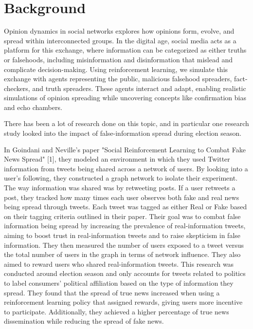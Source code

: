 \documentclass[twoside]{article}
\begin{document}
\section{Background}
Opinion dynamics in social networks explores how opinions form, evolve, and spread within interconnected groups. In the digital age, social media acts as a platform for this exchange, where information can be categorized as either truths or falsehoods, including misinformation and disinformation that mislead and complicate decision-making. Using reinforcement learning, we simulate this exchange with agents representing the public, malicious falsehood spreaders, fact-checkers, and truth spreaders. These agents interact and adapt, enabling realistic simulations of opinion spreading while uncovering concepts like confirmation bias and echo chambers.


There has been a lot of research done on this topic, and in particular one research study looked into the impact of false-information spread during election season.

In Goindani and Neville's paper "Social Reinforcement Learning to Combat Fake News Spread" [1], they modeled an environment in which they used Twitter information from tweets being shared across a network of users. By looking into a user's following, they constructed a graph network to isolate their experiment. The way information was shared was by retweeting posts. If a user retweets a post, they tracked how many times each user observes both fake and real news being spread through tweets. Each tweet was tagged as either Real or Fake based on their tagging criteria outlined in their paper. Their goal was to combat false information being spread by increasing the prevalence of real-information tweets, aiming to boost trust in real-information tweets and to raise skepticism in false information. They then measured the number of users exposed to a tweet versus the total number of users in the graph in terms of network influence. They also aimed to reward users who shared real-information tweets. This research was conducted around election season and only accounts for tweets related to politics to label consumers' political affiliation based on the type of information they spread. They found that the spread of true news increased when using a reinforcement learning policy that assigned rewards, giving users more incentive to participate. Additionally, they achieved a higher percentage of true news dissemination while reducing the spread of fake news.
\end{document}
